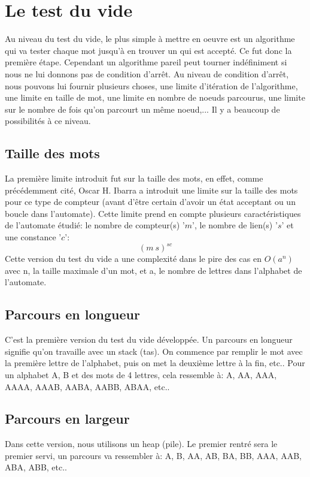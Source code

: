 \section{Le test du vide}
Au niveau du test du vide, le plus simple à mettre en oeuvre est un algorithme qui va tester chaque mot jusqu'à en trouver un qui est accepté. Ce fut donc la première étape. Cependant un algorithme pareil peut tourner indéfiniment si nous ne lui donnons pas de condition d'arrêt. Au niveau de condition d'arrêt, nous pouvons lui fournir plusieurs choses, une limite d'itération de l'algorithme, une limite en taille de mot, une limite en nombre de noeuds parcourus, une limite sur le nombre de fois qu'on parcourt un même noeud,... Il y a beaucoup de possibilités à ce niveau.\\


\subsection{Taille des mots}
La première limite introduit fut sur la taille des mots, en effet, comme précédemment cité, Oscar H. Ibarra a introduit une limite sur la taille des mots pour ce type de compteur (avant d'être certain d'avoir un état acceptant ou un boucle dans l'automate). Cette limite prend en compte plusieurs caractéristiques de l'automate étudié: le nombre de compteur(s) '$m$', le nombre de lien(s) '$s$' et une constance '$c$':
\[ ( m \  s ) ^{s  c} \]
Cette version du test du vide a une complexité dans le pire des cas en $O(a^{n})$ avec n, la taille maximale d'un mot, et a, le nombre de lettres dans l'alphabet de l'automate.

\subsection{Parcours en longueur}
C'est la première version du test du vide développée. Un parcours en longueur signifie qu'on travaille avec un stack (tas). On commence par remplir le mot avec la première lettre de l'alphabet, puis on met la deuxième lettre à la fin, etc.. Pour un alphabet {A, B} et des mots de 4 lettres, cela ressemble à: A, AA, AAA, AAAA, AAAB, AABA, AABB, ABAA, etc..

\subsection{Parcours en largeur}
Dans cette version, nous utilisons un heap (pile). Le premier rentré sera le premier servi, un parcours va ressembler à: A, B, AA, AB, BA, BB, AAA, AAB, ABA, ABB, etc..